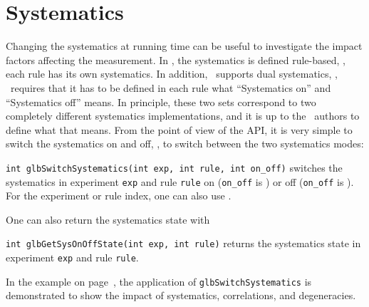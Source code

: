 \section{Systematics}
\label{sec:systematics}

Changing the systematics at running time can be useful to investigate
the impact factors affecting the measurement.
In \GLOBES , the systematics is defined rule-based, \ie, each rule
has its own systematics. 
In addition, \GLOBES\ supports dual systematics, \ie, \AEDL\ requires that it has to be
defined in each rule what ``Systematics on'' and ``Systematics off'' means.
In principle, these two sets correspond to two completely different systematics
implementations, and it is up to the \AEDL\ authors to define what that means.
From the point of view of the API, it is very simple to switch the systematics on and off, \ie,
to switch between the two systematics modes:
\begin{function}
{\tt int glbSwitchSystematics(int exp, int rule, int on\_off)}
switches the systematics in experiment {\tt exp} and rule {\tt rule}
on ({\tt on\_off} is ) or off ({\tt on\_off} is ). For the experiment or
rule index, one can also use . 
\end{function}
One can also return the systematics state with
\begin{function}
{\tt int glbGetSysOnOffState(int exp, int rule)}
returns the systematics state in experiment {\tt exp} and rule {\tt rule}. 
\end{function}
In the example on page~\pageref{ex:barcharts}, the application of
{\tt glbSwitchSystematics} is demonstrated to show the impact of
systematics, correlations, and degeneracies.

